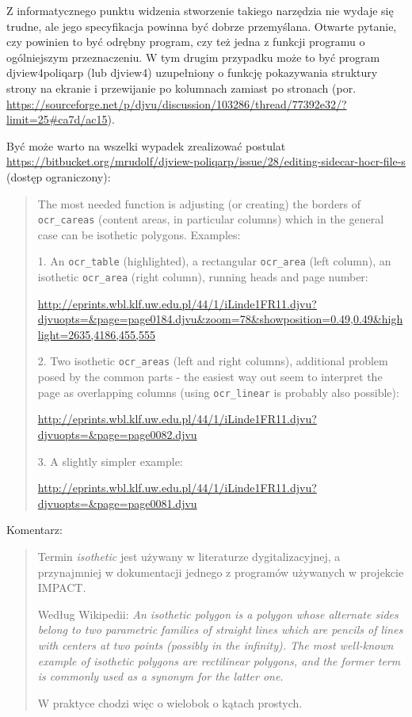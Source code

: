 \documentclass[12]{mwart}
\newcommand{\program}[1]{\textsf{#1}}
\begin{document}
Z informatycznego punktu widzenia stworzenie takiego narzędzia nie
wydaje się trudne, ale jego specyfikacja powinna być dobrze
przemyślana. Otwarte pytanie, czy powinien to być odrębny program, czy
też jedna z funkcji programu o ogólniejszym przeznaczeniu. W tym
drugim przypadku może to być program \program{djview4poliqarp} (lub
\textsf{djview4}) uzupełniony o funkcję pokazywania struktury strony
na ekranie i przewijanie po kolumnach zamiast po stronach
(por. \url{https://sourceforge.net/p/djvu/discussion/103286/thread/77392e32/?limit=25#ca7d/ac15}).

Być może warto na wszelki wypadek zrealizować postulat
\url{https://bitbucket.org/mrudolf/djview-poliqarp/issue/28/editing-sidecar-hocr-file-s}
(dostęp ograniczony):
\begin{quote}
  The most needed function is adjusting (or creating) the borders of
  \verb|ocr_careas| (content areas, in particular columns) which in
  the general case can be isothetic polygons. Examples:

1. An \verb|ocr_table| (highlighted), a rectangular \verb|ocr_area| (left column), an isothetic \verb|ocr_area| (right column), running heads and page number:

 \url{http://eprints.wbl.klf.uw.edu.pl/44/1/iLinde1FR11.djvu?djvuopts=&page=page0184.djvu&zoom=78&showposition=0.49,0.49&highlight=2635,4186,455,555}

2. Two isothetic \verb|ocr_areas| (left and right columns), additional
problem posed by the common parts - the easiest way out seem to
interpret the page as overlapping columns (using \verb|ocr_linear| is
probably also possible):

 \url{http://eprints.wbl.klf.uw.edu.pl/44/1/iLinde1FR11.djvu?djvuopts=&page=page0082.djvu}

3. A slightly simpler example:

\url{http://eprints.wbl.klf.uw.edu.pl/44/1/iLinde1FR11.djvu?djvuopts=&page=page0081.djvu}

\end{quote}

Komentarz:


\begin{quote}
  \small
  Termin \textit{isothetic} jest używany w literaturze
  dygitalizacyjnej, a przynajmniej w dokumentacji jednego z programów
  używanych w projekcie IMPACT.

  Według Wikipedii: \textit{An isothetic polygon is a polygon whose
    alternate sides belong to two parametric families of straight
    lines which are pencils of lines with centers at two points
    (possibly in the infinity). The most well-known example of
    isothetic polygons are rectilinear polygons, and the former term
    is commonly used as a synonym for the latter one}.

  W praktyce chodzi więc o wielobok o kątach prostych.
\end{quote}
\end{document}
